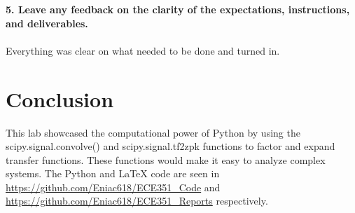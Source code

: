 \documentclass[12pt]{report}
\begin{document}
\textbf{5. Leave any feedback on the clarity of the expectations, instructions, and deliverables.} \\ \\
Everything was clear on what needed to be done and turned in.

\section{Conclusion}
This lab showcased the computational power of Python by using the scipy.signal.convolve() and scipy.signal.tf2zpk functions to factor and expand transfer functions. These functions would make it easy to analyze complex systems. The Python and \LaTeX{} code are seen in \url{https://github.com/Eniac618/ECE351_Code} and \url{https://github.com/Eniac618/ECE351_Reports} respectively.
\end{document}
